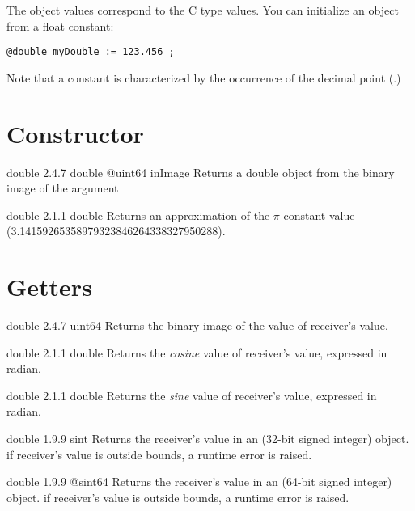 

The  object values correspond to the C type  values. You can initialize an  object from a float constant:

\texttt{@double myDouble := 123.456 ;}

Note that a  constant is characterized by the occurrence of the decimal point (.)

\section{Constructor}

{double}
{2.4.7}
{double}
{@uint64 inImage}
{Returns a double object from the binary image of the argument}
{}

{double}
{2.1.1}
{double}
{Returns an approximation of the $\pi$ constant value (3.14159265358979323846264338327950288).}
{}

\section{Getters}

{double}
{2.4.7}
{uint64}
{Returns the binary image of the value of receiver's value.}
{}




{double}
{2.1.1}
{double}
{Returns the \emph{cosine} value of receiver's value, expressed in radian.}
{}




{double}
{2.1.1}
{double}
{Returns the \emph{sine} value of receiver's value, expressed in radian.}
{}




{double}
{1.9.9}
{sint}
{Returns the receiver's value in an  (32-bit signed integer) object.}
{if receiver's value is outside  bounds, a runtime error is raised.}



{double}
{1.9.9}
{@sint64}
{Returns the receiver's value in an  (64-bit signed integer) object.}
{if receiver's value is outside  bounds, a runtime error is raised.}




